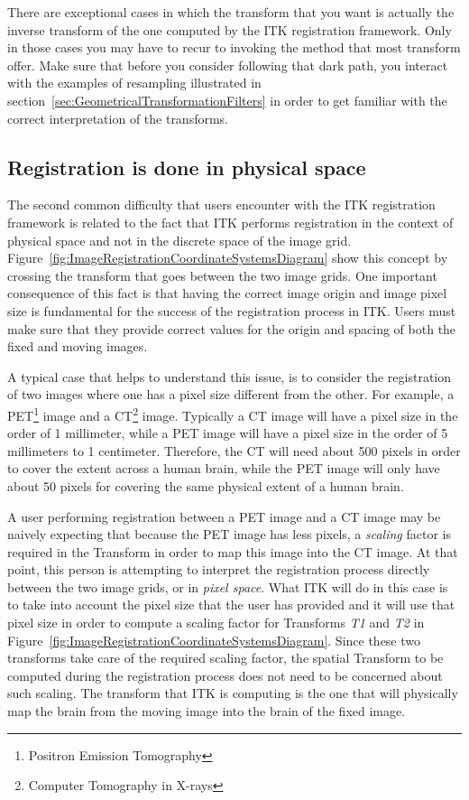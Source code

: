 There are exceptional cases in which the transform that you want is actually
the inverse transform of the one computed by the ITK registration framework.
Only in those cases you may have to recur to invoking the 
method that most transform offer.  Make sure that before you consider following
that dark path, you interact with the examples of resampling illustrated in
section~\ref{sec:GeometricalTransformationFilters} in order to get familiar
with the correct interpretation of the transforms.


\subsection{Registration is done in physical space}
\label{sec:RegistrationIsDoneInPhysicalSpace}

The second common difficulty that users encounter with the ITK registration
framework is related to the fact that ITK performs registration in the context
of physical space and not in the discrete space of the image grid.
Figure~\ref{fig:ImageRegistrationCoordinateSystemsDiagram} show this concept by
crossing the transform that goes between the two image grids. One important
consequence of this fact is that having the correct image origin and image
pixel size is fundamental for the success of the registration process in ITK.
Users must make sure that they provide correct values for the origin and
spacing of both the fixed and moving images.

A typical case that helps to understand this issue, is to consider the
registration of two images where one has a pixel size different from the other.
For example, a PET\footnote{Positron Emission Tomography} image and a
CT\footnote{Computer Tomography in X-rays} image. Typically a CT image will
have a pixel size in the order of 1 millimeter, while a PET image will have a
pixel size in the order of 5 millimeters to 1 centimeter. Therefore, the CT
will need about 500 pixels in order to cover the extent across a human brain, while
the PET image will only have about 50 pixels for covering the same physical
extent of a human brain. 

A user performing registration between a PET image and a CT image may be
naively expecting that because the PET image has less pixels, a {\em scaling}
factor is required in the Transform in order to map this image into the CT
image. At that point, this person is attempting to interpret the registration
process directly between the two image grids, or in {\em pixel space}. What ITK
will do in this case is to take into account the pixel size that the user has
provided and it will use that pixel size in order to compute a scaling factor
for Transforms {\em T1} and {\em T2} in
Figure~\ref{fig:ImageRegistrationCoordinateSystemsDiagram}. Since these two
transforms take care of the required scaling factor, the spatial Transform to
be computed during the registration process does not need to be concerned about
such scaling. The transform that ITK is computing is the one that will
physically map the brain from the moving image into the brain of the fixed
image.

